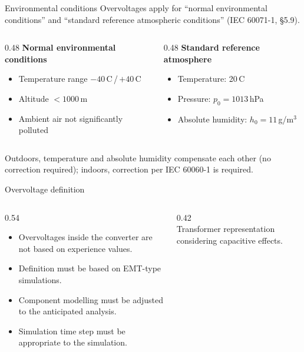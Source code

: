 \begin{frame}{Environmental conditions}
  Overvoltages apply for ``normal environmental conditions'' and ``standard
  reference atmospheric conditions'' (IEC 60071-1, §5.9).
  \begin{columns}[T,onlytextwidth]
    \begin{column}{0.48\textwidth}
      \textbf{Normal environmental conditions}
      \begin{itemize}
        \setlength{\itemsep}{0.3em}
        \item Temperature range $-40$\,\textdegree C\,/\,$+40$\,\textdegree C
        \item Altitude $<1000$\,m
        \item Ambient air not significantly polluted
      \end{itemize}
    \end{column}
    \begin{column}{0.48\textwidth}
      \textbf{Standard reference atmosphere}
      \begin{itemize}
        \setlength{\itemsep}{0.3em}
        \item Temperature: 20\,\textdegree C
        \item Pressure: $p_0 = 1013$\,hPa
        \item Absolute humidity: $h_0 = 11$\,g/m$^3$
      \end{itemize}
    \end{column}
  \end{columns}
  \vspace{0.4em}
  {\color{atGray}\footnotesize Outdoors, temperature and absolute humidity
  compensate each other (no correction required); indoors, correction per
  IEC 60060-1 is required.}
\end{frame}

\begin{frame}{Overvoltage definition}
  \begin{columns}[c,onlytextwidth]
    \begin{column}{0.54\textwidth}
      \begin{itemize}
        \setlength{\itemsep}{0.45em}
        \item Overvoltages inside the converter are not based on experience
              values.
        \item Definition must be based on EMT-type simulations.
        \item Component modelling must be adjusted to the anticipated analysis.
        \item Simulation time step must be appropriate to the simulation.
      \end{itemize}
    \end{column}
    \begin{column}{0.42\textwidth}
      \centering
      \\[0.3em]
      {\color{atGray}\footnotesize Transformer representation considering
      capacitive effects.}
    \end{column}
  \end{columns}
\end{frame}

